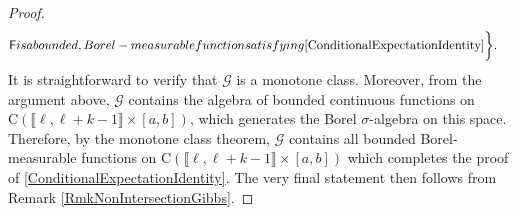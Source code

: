 \documentclass[10pt,a4paper]{amsart}
\begin{document}
\begin{proof}
\begin{align*}
    &\mathsf{F} \textnormal{ is a bounded, Borel-measurable function satisfying }\eqref{ConditionalExpectationIdentity}  \bigg\}.
\end{align*}
It is straightforward to verify that \(\mathscr{G}\) is a monotone class. Moreover, from the argument above, \(\mathscr{G}\) contains the algebra of bounded continuous functions on \(\mathrm{C}\left(\llbracket \ell, \ell+k-1\rrbracket \times [a,b]\right)\), which generates the Borel \(\sigma\)-algebra on this space. Therefore, by the monotone class theorem, \(\mathscr{G}\) contains all bounded Borel-measurable functions on \(\mathrm{C}\left(\llbracket \ell, \ell+k-1\rrbracket \times [a,b]\right)\) which completes the proof of \eqref{ConditionalExpectationIdentity}. The very final statement then follows from Remark \ref{RmkNonIntersectionGibbs}.
\end{proof}
\end{document}

